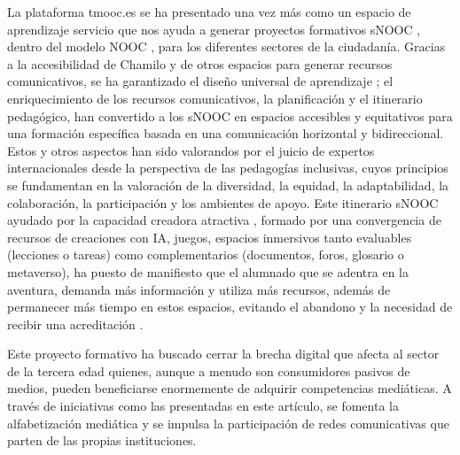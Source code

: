 La plataforma tmooc.es se ha presentado una vez más como un espacio de
aprendizaje servicio que nos ayuda a generar proyectos formativos sNOOC
\cite{huesoromero2024}, dentro del modelo
NOOC \cite{clark2013moocs,cabrera2021}, para los
diferentes sectores de la ciudadanía. Gracias a la accesibilidad de
Chamilo y de otros espacios para generar recursos comunicativos, se ha
garantizado el diseño universal de aprendizaje \cite{SanchezFuentes2023};
el enriquecimiento de los recursos comunicativos, la planificación y el
itinerario pedagógico, han convertido a los sNOOC en espacios accesibles
y equitativos para una formación específica \cite{cabrera2021} basada en una comunicación horizontal y bidireccional.
Estos y otros aspectos han sido valorandos por el juicio de expertos
internacionales desde la perspectiva de las pedagogías inclusivas, cuyos
principios se fundamentan en la valoración de la diversidad, la equidad,
la adaptabilidad, la colaboración, la participación y los ambientes de
apoyo. Este itinerario sNOOC ayudado por la capacidad creadora atractiva
\cite{watters2022}, formado por una convergencia de recursos de creaciones
con IA, juegos, espacios inmersivos \cite{cárdeasbenavides2024} tanto evaluables (lecciones o tareas) como complementarios
(documentos, foros, glosario o metaverso), ha puesto de manifiesto que
el alumnado que se adentra en la aventura, demanda más información y
utiliza más recursos, además de permanecer más tiempo en estos espacios,
evitando el abandono \cite{Ratnasari2024} y la necesidad de
recibir una acreditación \cite{Rahimi2024}.

Este proyecto formativo ha buscado cerrar la brecha digital que afecta
al sector de la tercera edad quienes, aunque a menudo son consumidores
pasivos de medios, pueden beneficiarse enormemente de adquirir
competencias mediáticas. A través de iniciativas como las presentadas en
este artículo, se fomenta la alfabetización mediática y se impulsa la
participación de redes comunicativas que parten de las propias
instituciones.

